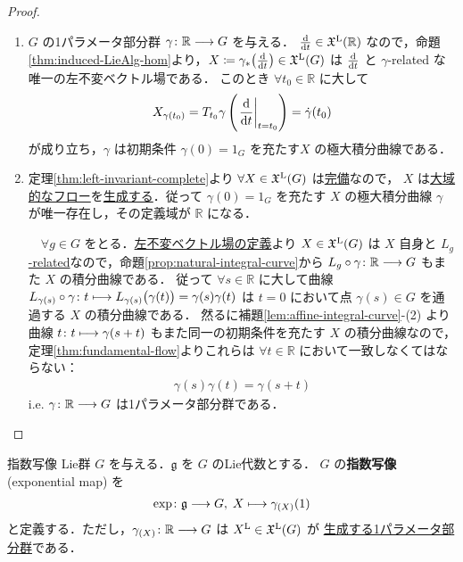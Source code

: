 \documentclass[TQFT_main]{subfiles}
\begin{document}
\begin{proof}
    \begin{enumerate}
        \item $G$ の1パラメータ部分群 $\gamma \colon \mathbb{R} \longrightarrow G$ を与える．
        $\dv{}{t} \in \mathfrak{X}^{\mathrm{L}}(\mathbb{R})$ なので，命題\ref{thm:induced-LieAlg-hom}より，$X \coloneqq \gamma_* \bigl(\dv{}{t}\bigr) \in \mathfrak{X}^{\mathrm{L}}(G)$ は $\dv{}{t}$ と $\gamma$-related な唯一の左不変ベクトル場である．
        このとき $\forall t_0 \in \mathbb{R}$ に大して
        \begin{align}
            X_{\gamma(t_0)} = T_{t_0} \gamma \left( \eval{\dv{}{t}}_{t=t_0} \right) = \dot{\gamma}(t_0)
        \end{align}
        が成り立ち，$\gamma$ は初期条件 $\gamma(0) = 1_G$ を充たす$X$ の極大積分曲線である．
        \item 定理\ref{thm:left-invariant-complete}より $\forall X \in \mathfrak{X}^{\mathrm{L}}(G)$ は\hyperref[def:complete-vecf]{完備}なので，
        $X$ は\hyperref[def:global-flow]{大域的なフロー}を\hyperref[thm:fundamental-flow]{生成する}．従って $\gamma(0) = 1_G$ を充たす $X$ の極大積分曲線 $\gamma$ が唯一存在し，その定義域が $\mathbb{R}$ になる．
        
        　$\forall g \in G$ をとる．\hyperref[def:left-invariant]{左不変ベクトル場の定義}より $X \in \mathfrak{X}^{\mathrm{L}}(G)$ は $X$ 自身と \hyperref[def:F-related]{$L_g$-related}なので，命題\ref{prop:natural-integral-curve}から $L_g \circ \gamma \colon \mathbb{R} \longrightarrow G$ もまた $X$ の積分曲線である．
        従って $\forall s \in \mathbb{R}$ に大して曲線 $L_{\gamma(s)} \circ \gamma \colon t \longmapsto L_{\gamma(s)} \bigl( \gamma(t) \bigr) = \gamma(s) \gamma(t)$ は $t=0$ において点 $\gamma(s) \in G$ を通過する $X$ の積分曲線である．
        然るに補題\ref{lem:affine-integral-curve}-(2) より曲線 $t \colon t \longmapsto \gamma(s+t)$ もまた同一の初期条件を充たす $X$ の積分曲線なので，定理\ref{thm:fundamental-flow}よりこれらは $\forall t \in \mathbb{R}$ において一致しなくてはならない：
        \begin{align}
            \gamma(s) \gamma(t) = \gamma(s+t)
        \end{align}
        i.e. $\gamma \colon \mathbb{R} \longrightarrow G$ は1パラメータ部分群である．
    \end{enumerate}
    
\end{proof}

\begin{mydef}[label=def:exp]{指数写像}
    Lie群 $G$ を与える．$\mathfrak{g}$ を $G$ のLie代数とする．
    $G$ の\textbf{指数写像} (exponential map) を
    \begin{align}
        \exp \colon \mathfrak{g} \longrightarrow G,\; X \longmapsto \gamma_{(X)}(1)
    \end{align}
    と定義する．ただし，$\gamma_{(X)} \colon \mathbb{R} \longrightarrow G$ は $X^{\mathrm{L}} \in \mathfrak{X}^{\mathrm{L}}(G)$ が \hyperref[prop:one-parameter-basic]{生成する1パラメータ部分群}である．
\end{mydef}
\end{document}
